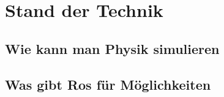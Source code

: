 
\chapter{Stand der Technik}

\section{Wie kann man Physik simulieren}

\section{Was gibt Ros für Möglichkeiten}